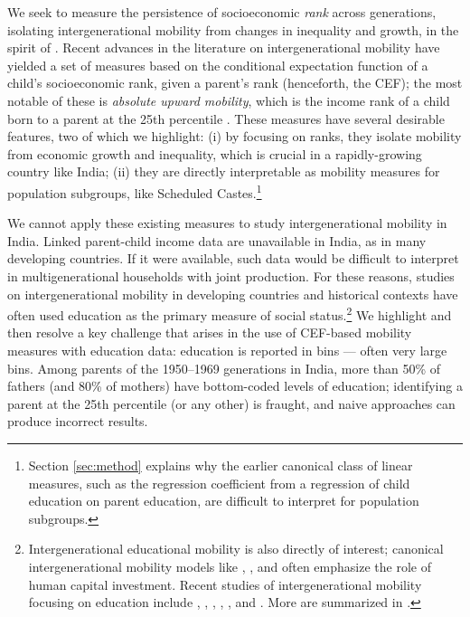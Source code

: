 \documentclass[12pt,letterpaper]{article}
\numberwithin{equation}{section}
\begin{document}
We seek to measure the persistence of socioeconomic \textit{rank} across generations, isolating intergenerational mobility from changes in inequality and growth, in the spirit of . Recent advances in the literature on intergenerational mobility have yielded a set of measures based on the conditional expectation function of a child's socioeconomic rank, given a parent's rank (henceforth, the CEF); the most notable of these is \textit{absolute upward mobility}, which is the income rank of a child born to a parent at the 25th percentile \cite{chetty2014c}. These measures have several desirable features, two of which we highlight: (i) by focusing on ranks, they isolate mobility from economic growth and inequality, which is crucial in a rapidly-growing country like India; (ii) they are directly interpretable as mobility measures for population subgroups, like Scheduled Castes.\footnote{Section \ref{sec:method} explains why the earlier canonical class of linear measures, such as the regression coefficient from a regression of child education on parent education, are difficult to interpret for population subgroups.}

We cannot apply these existing measures to study intergenerational mobility in India. Linked parent-child income data are unavailable in India, as in many developing countries. If it were available, such data would be difficult to interpret in multigenerational households with joint production. For these reasons, studies on intergenerational mobility in developing countries and historical contexts have often used education as the primary measure of social status.\footnote{Intergenerational educational mobility is also directly of interest; canonical intergenerational mobility models like , , and  often emphasize the role of human capital investment. Recent studies of intergenerational mobility focusing on education include , , , , , and . More are summarized in .} We highlight and then resolve a key challenge that arises in the use of CEF-based mobility measures with education data: education is reported in bins --- often very large bins. Among parents of the 1950--1969 generations in India, more than 50\% of fathers (and 80\% of mothers) have bottom-coded levels of education; identifying a parent at the 25th percentile (or any other) is fraught, and naive approaches can produce incorrect results.
\end{document}
